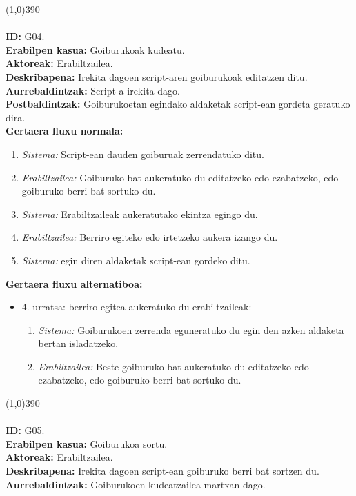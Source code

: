 \line(1,0){390}\\
\noindent\\
\textbf{ID:} G04.\\
\textbf{Erabilpen kasua:} Goiburukoak kudeatu.\\
\textbf{Aktoreak:} Erabiltzailea.\\
\textbf{Deskribapena:} Irekita dagoen script-aren goiburukoak editatzen ditu.\\
\textbf{Aurrebaldintzak:} Script-a irekita dago.\\
\textbf{Postbaldintzak:} Goiburukoetan egindako aldaketak script-ean gordeta geratuko dira.\\
\textbf{Gertaera fluxu normala:}
\begin{enumerate}
	\item \textit{Sistema:} Script-ean dauden goiburuak zerrendatuko ditu.
	\item \textit{Erabiltzailea:} Goiburuko bat aukeratuko du editatzeko edo ezabatzeko, edo goiburuko berri bat sortuko du.
	\item \textit{Sistema:} Erabiltzaileak aukeratutako ekintza egingo du.
	\item \textit{Erabiltzailea:} Berriro egiteko edo irtetzeko aukera izango du.
	\item \textit{Sistema:} egin diren aldaketak script-ean gordeko ditu.
\end{enumerate}
\textbf{Gertaera fluxu alternatiboa:}
\begin{itemize}
	\item 4. urratsa: berriro egitea aukeratuko du erabiltzaileak:
		\begin{enumerate}
		\item \textit{Sistema:} Goiburukoen zerrenda eguneratuko du egin den azken aldaketa bertan isladatzeko.
		\item \textit{Erabiltzailea:} Beste goiburuko bat aukeratuko du editatzeko edo ezabatzeko, edo goiburuko berri bat sortuko du.
		\end{enumerate}
\end{itemize}
\line(1,0){390}\\
\noindent\\
\textbf{ID:} G05.\\
\textbf{Erabilpen kasua:} Goiburukoa sortu.\\
\textbf{Aktoreak:} Erabiltzailea.\\
\textbf{Deskribapena:} Irekita dagoen script-ean goiburuko berri bat sortzen du.\\
\textbf{Aurrebaldintzak:} Goiburukoen kudeatzailea martxan dago.\\
